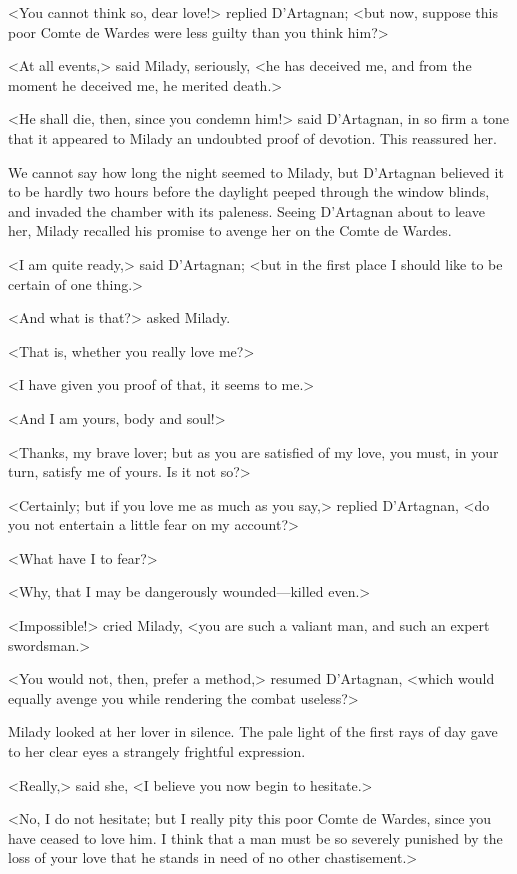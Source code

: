 <You cannot think so, dear love!> replied D'Artagnan; <but now, suppose this poor Comte de Wardes were less guilty than you think him?> 

<At all events,> said Milady, seriously, <he has deceived me, and from the moment he deceived me, he merited death.> 

<He shall die, then, since you condemn him!> said D'Artagnan, in so firm a tone that it appeared to Milady an undoubted proof of devotion. This reassured her. 

We cannot say how long the night seemed to Milady, but D'Artagnan believed it to be hardly two hours before the daylight peeped through the window blinds, and invaded the chamber with its paleness. Seeing D'Artagnan about to leave her, Milady recalled his promise to avenge her on the Comte de Wardes. 

<I am quite ready,> said D'Artagnan; <but in the first place I should like to be certain of one thing.> 

<And what is that?> asked Milady. 

<That is, whether you really love me?> 

<I have given you proof of that, it seems to me.> 

<And I am yours, body and soul!> 

<Thanks, my brave lover; but as you are satisfied of my love, you must, in your turn, satisfy me of yours. Is it not so?> 

<Certainly; but if you love me as much as you say,> replied D'Artagnan, <do you not entertain a little fear on my account?> 

<What have I to fear?> 

<Why, that I may be dangerously wounded—killed even.> 

<Impossible!> cried Milady, <you are such a valiant man, and such an expert swordsman.> 

<You would not, then, prefer a method,> resumed D'Artagnan, <which would equally avenge you while rendering the combat useless?> 

Milady looked at her lover in silence. The pale light of the first rays of day gave to her clear eyes a strangely frightful expression. 

<Really,> said she, <I believe you now begin to hesitate.> 

<No, I do not hesitate; but I really pity this poor Comte de Wardes, since you have ceased to love him. I think that a man must be so severely punished by the loss of your love that he stands in need of no other chastisement.> 


